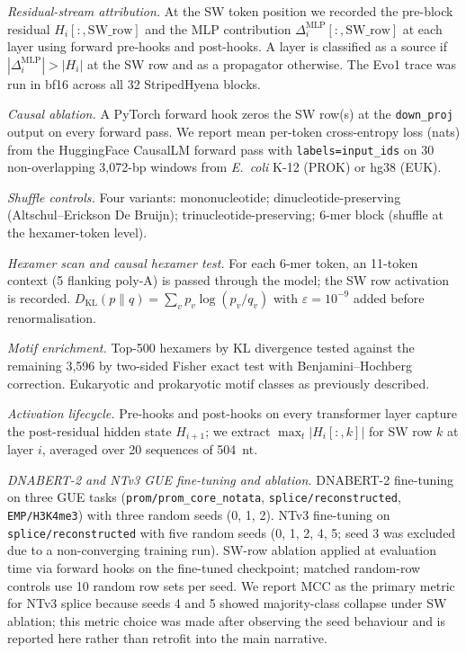 \documentclass[11pt]{article}
\begin{document}
\textit{Residual-stream attribution.}
At the SW token position we recorded the pre-block residual
$H_i[:, \mathrm{SW\_row}]$ and the MLP contribution
$\Delta_i^{\mathrm{MLP}}[:, \mathrm{SW\_row}]$ at each layer using
forward pre-hooks and post-hooks. A layer is classified as a source
if $|\Delta_i^{\mathrm{MLP}}| > |H_i|$ at the SW row and as a
propagator otherwise. The Evo1 trace was run in bf16 across all 32
StripedHyena blocks.

\textit{Causal ablation.}
A PyTorch forward hook zeros the SW row(s) at the
\texttt{down\_proj} output on every forward pass. We report mean
per-token cross-entropy loss (nats) from the HuggingFace CausalLM
forward pass with \texttt{labels=input\_ids} on 30 non-overlapping
3{,}072-bp windows from \textit{E.~coli} K-12 (PROK) or hg38 (EUK).

\textit{Shuffle controls.}
Four variants: mononucleotide; dinucleotide-preserving
(Altschul--Erickson De Bruijn); trinucleotide-preserving;
6-mer block (shuffle at the hexamer-token level).

\textit{Hexamer scan and causal hexamer test.}
For each 6-mer token, an 11-token context (5 flanking poly-A) is
passed through the model; the SW row activation is recorded.
$D_{\mathrm{KL}}(p\|q) = \sum_v p_v \log(p_v/q_v)$ with
$\varepsilon = 10^{-9}$ added before renormalisation.

\textit{Motif enrichment.}
Top-500 hexamers by KL divergence tested against the remaining
3{,}596 by two-sided Fisher exact test with Benjamini--Hochberg
correction. Eukaryotic and prokaryotic motif classes as previously
described.

\textit{Activation lifecycle.}
Pre-hooks and post-hooks on every transformer layer capture the
post-residual hidden state $H_{i+1}$; we extract
$\max_t |H_i[:,k]|$ for SW row $k$ at layer $i$, averaged over 20
sequences of 504~nt.

\textit{DNABERT-2 and NTv3 GUE fine-tuning and ablation.}
DNABERT-2 fine-tuning on three GUE tasks
(\texttt{prom/prom\_core\_notata}, \texttt{splice/reconstructed},
\texttt{EMP/H3K4me3}) with three random seeds (0, 1, 2). NTv3
fine-tuning on \texttt{splice/reconstructed} with five random seeds
(0, 1, 2, 4, 5; seed 3 was excluded due to a non-converging
training run). SW-row ablation applied at evaluation time via
forward hooks on the fine-tuned checkpoint; matched random-row
controls use 10 random row sets per seed. We report MCC as the
primary metric for NTv3 splice because seeds 4 and 5 showed
majority-class collapse under SW ablation; this metric choice was
made after observing the seed behaviour and is reported here rather
than retrofit into the main narrative.
\end{document}
